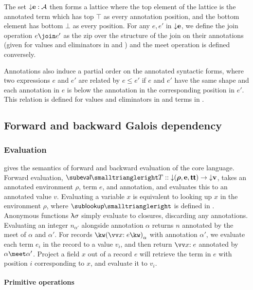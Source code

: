 The set ${\downarrow}{\mathbf{e}} : \mathcal{A}$ then forms a lattice where the top element of the lattice is the annotated term which has top $\top$ as every annotation position, and the bottom element has bottom $\bot$ as every position. For any $e, e'$ in ${\downarrow}{\mathbf{e}}$, we define the join operation $e \join e'$ as the zip over the structure of the join on their annotations (given for values and eliminators in  and ) and the meet operation is defined conversely.

Annotations also induce a partial order on the annotated syntactic forms, where two expressions $e$ and $e'$ are related by $e \leq e'$ if $e$ and $e'$ have the same shape and each annotation in $e$ is below the annotation in the corresponding position in $e'$.  This relation is defined for values and eliminators in  and terms in .

\subsection{Forward and backward Galois dependency}
\label{sec:core-language:fwd-bwd}

\subsubsection{Evaluation}

 gives the semantics of forward and backward evaluation of the core language. Forward evaluation, $\evalFwdF{T} :: \Below{(\boldsymbol{\rho},\mathbf{e},\boldsymbol{\TT})} \to \Below{\mathbf{v}}$, takes an annotated environment $\rho$, term $e$, and annotation, and evaluates this to an annotated value $v$. Evaluating a variable $x$ is equivalent to looking up $x$ in the environment $\rho$, where $\envLookupFwdF{}$ is defined in . Anonymous functions $\uplambda{\sigma}$ simply evaluate to closures, discarding any annotations. Evaluating an integer $n_{\alpha'}$ alongside annotation $\alpha$ returns $n$ annotated by the meet of $\alpha$ and $\alpha'$. For records $\exRec{\vec{\bind{x}{e}}}_{\alpha}$ with annotation $\alpha'$, we evaluate each term $e_i$ in the record to a value $v_i$, and then return $\vec{\bind{x}{e}}$ annotated by $\alpha \meet \alpha'$. Project a field $x$ out of a record $e$ will retrieve the term in $e$ with position $i$ corresponding to $x$, and evaluate it to $v_i$.

\paragraph{Primitive operations}

